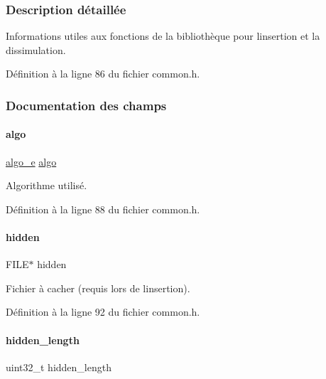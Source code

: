 \subsubsection{Description détaillée}
Informations utiles aux fonctions de la bibliothèque pour l\textquotesingle{}insertion et la dissimulation. 

Définition à la ligne 86 du fichier common.\+h.



\subsubsection{Documentation des champs}
\mbox{\label{a00154_aa6ad0a3fe5b1489edc6684da68c3b588}} 
\paragraph{\texorpdfstring{algo}{algo}}
{\footnotesize\ttfamily \hyperlink{a00008_adbe3e383e3f1c4239b26ccae2865aa06}{algo\+\_\+e} \hyperlink{a00008_ad3066b71c7c05f99ce6c3bd88da7ac23}{algo}}

Algorithme utilisé. 

Définition à la ligne 88 du fichier common.\+h.

\mbox{\label{a00154_a4446bf5f9a9283edb73ae078e4aa3152}} 
\paragraph{\texorpdfstring{hidden}{hidden}}
{\footnotesize\ttfamily F\+I\+LE$\ast$ hidden}

Fichier à cacher (requis lors de l\textquotesingle{}insertion). 

Définition à la ligne 92 du fichier common.\+h.

\mbox{\label{a00154_a5faadf710cbff5ed6e2882e78216084c}} 
\paragraph{\texorpdfstring{hidden\+\_\+length}{hidden\_length}}
{\footnotesize\ttfamily uint32\+\_\+t hidden\+\_\+length}

